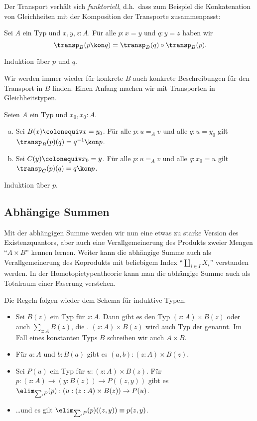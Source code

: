 Der Transport verhält sich \emph{funktoriell}, d.h.\ dass zum Beispiel die Konkatenation von Gleichheiten mit der Komposition der Transporte zusammenpasst:

\begin{lemma}
  Sei $A$ ein Typ und $x,y,z:A$. Für alle $p:x=y$ und $q:y=z$ haben wir
  \[
    \transp_B(p\kon q) = \transp_B(q) \circ \transp_B(p)\rlap{.}
  \]
\end{lemma}
\begin{beweis}
  Induktion über $p$ und $q$.
\end{beweis}

Wir werden immer wieder für konkrete $B$ auch konkrete Beschreibungen für den Transport in $B$ finden.
Einen Anfang machen wir mit Transporten in Gleichheitstypen.

\begin{lemma}
  \label{transport-gleichheitstyp}
  Seien $A$ ein Typ und $x_0,x_0:A$.
  \begin{enumerate}[(a)]
  \item Sei $B(x)\colonequiv x=y_0$. Für alle $p:u=_Av$ und alle $q:u=y_0$ gilt $\transp_B(p)(q)=q^{-1}\kon p$.
  \item Sei $C(y)\colonequiv x_0=y$. Für alle $p:u=_Av$ und alle $q:x_0=u$ gilt $\transp_C(p)(q)=q\kon p$.
  \end{enumerate}
\end{lemma}
\begin{beweis}
  Induktion über $p$.
\end{beweis}

\subsection{Abhängige Summen}
Mit der abhängigen Summe werden wir nun eine etwas zu starke Version des Existenzquantors, aber auch eine Verallgemeinerung des Produkts zweier Mengen ``$A\times B$'' kennen lernen.
Weiter kann die abhängige Summe auch als Verallgemeinerung des Koprodukts mit beliebigem Index ``$\coprod_{i\in I}X_i$'' verstanden werden.
In der Homotopietypentheorie kann man die abhängige Summe auch als Totalraum einer Faserung verstehen.

Die Regeln folgen wieder dem Schema für induktive Typen.

\begin{regeln}
\begin{itemize}
\item Sei $B(z)$ ein Typ für $z:A$. Dann gibt es den Typ $(z:A)\times B(z)$ oder auch $\sum_{z:A}B(z)$,
  die .
  $(z:A)\times B(z)$ wird auch Typ der  genannt.
  Im Fall eines konstanten Typs $B$ schreiben wir auch $A\times B$.
\item Für $a:A$ und $b:B(a)$ gibt es $(a,b):(z:A)\times B(z)$.
\item Sei $P(u)$ ein Typ für $u:(z:A)\times B(z)$.
  Für $p:(z:A) \to (y : B(z)) \to P((z,y))$ gibt es $\elim_{\sum,P}(p):(u:(z:A)\times B(z))\to P(u)$.
\item \dots und es gilt $\elim_{\sum,P}(p)((z,y))\equiv p(z,y)$.
\end{itemize}
\end{regeln}

